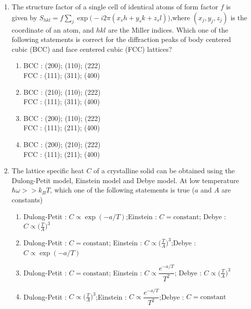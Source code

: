 \documentclass[journal,12pt,onecolumn]{IEEEtran}
\theoremstyle{remark}
\begin{document}
\begin{enumerate}
\item The structure factor of a single cell of identical atoms of form factor $f$ is given by $S_{hkl}=f\sum_j \exp\!\bigl(-i2\pi(x_s h + y_s k + z_s l)\bigr)$,where $(x_j ,y_j ,z_j)$ is the coordinate of an atom, and $hkl$ are the Miller indices. Which one of the following statements is correct for the diffraction peaks of body centered cubic (BCC) and face centered cubic (FCC) lattices?
\hfill{}
\begin{multicols}{2}
\begin{enumerate}
    \item BCC : (200); (110); (222) \\
          FCC : (111); (311); (400)
    \item BCC : (210); (110); (222) \\
          FCC : (111); (311); (400)
    \item BCC : (200); (110); (222) \\
          FCC : (111); (211); (400)
    \item BCC : (200); (210); (222) \\
          FCC : (111); (211); (400)
\end{enumerate}
\end{multicols}
\item The lattice specific heat $C$ of a crystalline solid can be obtained using the Dulong-Petit model, Einstein model and Debye model. At low temperature $\hbar\omega >> k_B T$, which one of the following statements is true ($a$ and $A$ are constants)
\hfill{}
\begin{enumerate}
    \item Dulong-Petit : $C\propto\exp(-a/T)$;Einstein : $C=\text{constant}$; Debye : $C\propto\bigl(\tfrac{T}{A}\bigr)^3$
    \item Dulong-Petit : $C=\text{constant}$; Einstein : $C\propto\bigl(\tfrac{T}{A}\bigr)^3$;Debye : $C\propto\exp(-a/T)$
    \item Dulong-Petit : $C=\text{constant}$;  Einstein : $C\propto\dfrac{e^{-a/T}}{T^2}$; Debye : $C\propto\bigl(\tfrac{T}{A}\bigr)^3$
    \item Dulong-Petit : $C\propto\bigl(\tfrac{T}{A}\bigr)^3$;Einstein : $C\propto\dfrac{e^{-a/T}}{T^2}$;Debye : $C=\text{constant}$
\end{enumerate}



\end{enumerate}
\end{document}
